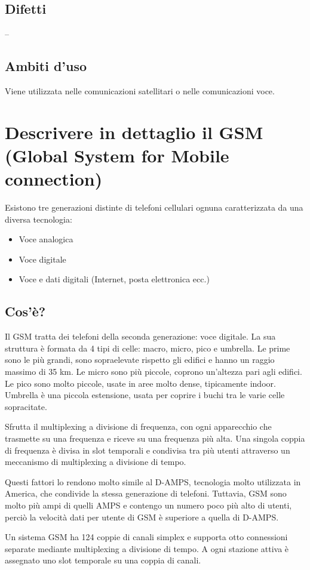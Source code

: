  \subsection{Difetti}
 --
 \subsection{Ambiti d'uso}
 Viene utilizzata nelle comunicazioni satellitari o nelle comunicazioni voce.
 
\section{Descrivere in dettaglio il GSM (Global System for Mobile connection)}
Esistono tre generazioni distinte di telefoni cellulari ognuna caratterizzata da una diversa tecnologia:
\begin{itemize}
\item	Voce analogica
\item	Voce digitale
\item	Voce e dati digitali (Internet, posta elettronica ecc.)
\end{itemize}
\subsection{Cos'è?}
Il GSM tratta dei telefoni della seconda generazione: voce digitale.
La sua struttura è formata da 4 tipi di celle: macro, micro, pico e umbrella. 
Le prime sono le più grandi, sono sopraelevate rispetto gli edifici e hanno un raggio massimo di 35 km. Le micro sono più piccole, coprono un'altezza pari agli edifici. Le pico sono molto piccole, usate in aree molto dense, tipicamente indoor. Umbrella è una piccola estensione, usata per coprire i buchi tra le varie celle sopracitate.

Sfrutta il multiplexing a divisione di frequenza, con ogni apparecchio che trasmette su una frequenza e riceve su una frequenza più alta. Una singola coppia di frequenza è divisa in slot temporali e condivisa tra più utenti attraverso un meccanismo di multiplexing a divisione di tempo.

Questi fattori lo rendono molto simile al D-AMPS, tecnologia molto utilizzata in America, che condivide la stessa generazione di telefoni. Tuttavia, GSM sono molto più ampi di quelli AMPS e contengo un numero poco più alto di utenti, perciò la velocità dati per utente di GSM è superiore a quella di D-AMPS.

Un sistema GSM ha 124 coppie di canali simplex e supporta otto connessioni separate mediante multiplexing a divisione di tempo.
A ogni stazione attiva è assegnato uno slot temporale su una coppia di canali.

